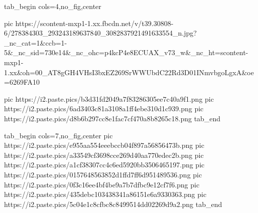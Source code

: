  
 
 
 
 


\ifcmt
  tab_begin cols=4,no_fig,center

     pic https://scontent-mxp1-1.xx.fbcdn.net/v/t39.30808-6/278384303_293243189637840_3082837921491633554_n.jpg?_nc_cat=1&ccb=1-5&_nc_sid=730e14&_nc_ohc=p4kcP4e8ECUAX_v73_w&_nc_ht=scontent-mxp1-1.xx&oh=00_AT8gGH4VHsI3bxEZ269SrWWUbdC22Rd3D01INmvbgoLgxA&oe=6269FA10

		 pic https://i2.paste.pics/b3d31fd2049a7f83286305ee7c40a9f1.png
		 pic https://i2.paste.pics/6ad3403c81a3108a1ff4ebe310d1c939.png
		 pic https://i2.paste.pics/d8b6b297cc8e1fac7cf470a8b8265c18.png
  tab_end
\fi

\ifcmt
  tab_begin cols=7,no_fig,center
     pic https://i2.paste.pics/e955aa554eeebccb04f897a56856473b.png
		 pic https://i2.paste.pics/a33549cf3698cce269d40aa770edec2b.png
		 pic https://i2.paste.pics/a1cf38307cc4c6ed5920bb3506465197.png
		 pic https://i2.paste.pics/0157648563852d1ffd7ff6d951489536.png
		 pic https://i2.paste.pics/0f3c16ee4bf4be9a7b7dfbc9e12cf7f6.png
		 pic https://i2.paste.pics/435debc103438341a86151e6a9330363.png
		 pic https://i2.paste.pics/5c04e1c8cfbc8c8499514dd02269d9a2.png
  tab_end
\fi
